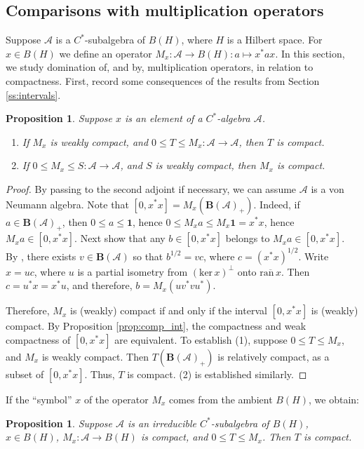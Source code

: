 \documentclass[12pt]{amsart}
\theoremstyle{plain}
\newtheorem{proposition}[theorem]{Proposition}
\theoremstyle{definition}
\renewcommand{\leq}{\leqslant}
\newcommand{\one}{\mathbf{1}}
\newcommand{\ball}{\mathbf{B}}
\newcommand{\A}{\mathcal{A}}
\def \ker{{\mathrm{ker}} \, }
\def \ran{{\mathrm{ran}} \, }
\begin{document}
\subsection{Comparisons with multiplication operators}\label{ss:mult_ops}

Suppose $\A$ is a $C^*$-subalgebra of $B(H)$, where $H$ is a Hilbert space.
For $x \in B(H)$ we define an operator $M_x : \A \to B(H) : a \mapsto x^* a x$.
In this section, we study domination of, and by, multiplication operators,
in relation to compactness. First, record some consequences of the results
from Section \ref{ss:intervals}.

\begin{proposition}\label{prop:mult from A}
Suppose $x$ is an element of a $C^*$-algebra $\A$.
\begin{enumerate}
\item
If $M_x$ is weakly compact, and $0 \leq T \leq M_x : \A \to \A$, then $T$ is compact.
\item
If $0 \leq M_x \leq S : \A \to \A$, and $S$ is weakly compact, then $M_x$ is compact.
\end{enumerate}
\end{proposition}

\begin{proof}
By passing to the second adjoint if necessary, we can assume $\A$ is a
von Neumann algebra. Note that $[0,x^*x] = M_x(\ball(\A)_+)$.
Indeed, if $a \in \ball(\A)_+$, then $0 \leq a \leq \one$, hence
$0 \leq M_x a \leq M_x \one = x^* x$, hence $M_x a \in [0, x^* x]$.
Next show that any $b \in [0, x^* x]$ belongs to $M_x a \in [0, x^* x]$.
By \cite[p. 11]{DixVNA}, there exists $v \in \ball(\A)$ so that
$b^{1/2} = v c$, where $c = (x^* x)^{1/2}$. Write $x = u c$,
where $u$ is a partial isometry from $(\ker x)^\perp$ onto
$\overline{\ran x}$. Then $c = u^* x = x^* u$, and therefore,
$b = M_x(u v^* v u^*)$.

Therefore, $M_x$ is (weakly) compact if and only if the interval
$[0,x^*x]$ is (weakly) compact. By Proposition \ref{prop:comp_int},
the compactness and weak compactness of $[0, x^*x]$
are equivalent. To establish (1), suppose
$0 \leq T \leq M_x$, and $M_x$ is weakly compact. Then
$T(\ball(\A)_+)$ is relatively compact, as a subset of $[0, x^* x]$.
Thus, $T$ is compact. (2) is established similarly.
\end{proof}


If the ``symbol'' $x$ of the operator $M_x$ comes from the ambient $B(H)$,
we obtain:

\begin{proposition}\label{prop:below_multipl}
Suppose $\A$ is an irreducible $C^*$-subalgebra of $B(H)$, $x \in B(H)$,
$M_x : \A \to B(H)$ is compact, and $0 \leq T \leq M_x$.
Then $T$ is compact.
\end{proposition}
\end{document}
